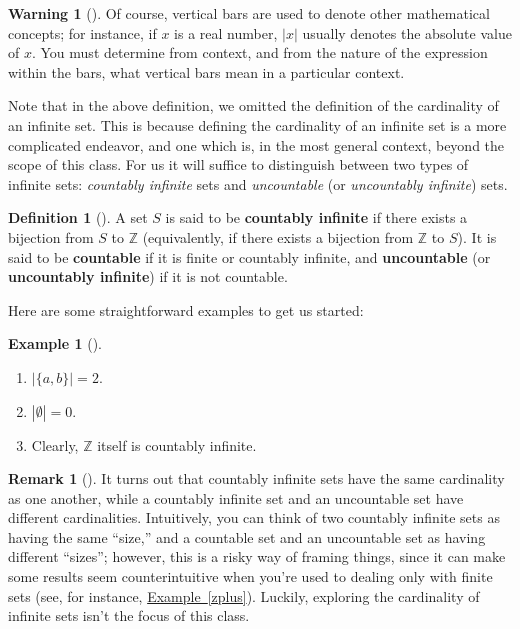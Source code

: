 \documentclass[10pt,]{book}
\newcommand{\terminology}[1]{\textbf{#1}}
\theoremstyle{plain}
\theoremstyle{definition}
\newtheorem{definition}[theorem]{Definition}
\theoremstyle{definition}
\newtheorem{remark}[theorem]{Remark}
\newtheorem{warning}[theorem]{Warning}
\theoremstyle{definition}
\newtheorem{example}[theorem]{Example}
\theoremstyle{definition}
\numberwithin{equation}{section}
\def\Z{\mathbb{Z}}
\begin{document}
    \begin{warning}[]\label{warning-3}
Of course, vertical bars are used to denote
    other mathematical concepts; for instance, if \(x\) is a real
    number, \(|x|\) usually denotes the absolute value of \(x\). You
    must determine from context, and from the nature of the
    expression within the bars, what vertical bars mean in a
    particular context.%
\end{warning}

%
\par
Note that in the above definition, we omitted the definition of the cardinality of an infinite set.  This is because defining the cardinality of an infinite set is a more complicated endeavor, and one which is, in the most general context, beyond the scope of this class.  For us it will suffice to distinguish between two types of infinite sets: \emph{countably infinite} sets and \emph{uncountable} (or \emph{uncountably infinite}) sets.%
\begin{definition}[{}]\label{definition-13}
 A set \(S\) is said to be \terminology{countably infinite} if there exists a bijection from \(S\) to \(\Z\) (equivalently, if there
        exists a bijection from \(\Z\) to \(S\)). It is said to be \terminology{countable} if it is finite or countably infinite, and \terminology{uncountable} (or \terminology{uncountably infinite}) if it is not countable.%
\end{definition}
\par
  Here are some straightforward examples to get us started:%
\begin{example}[]\label{example-8}


 
    \leavevmode%
\begin{enumerate}
\item\hypertarget{li-16}{} \(|\{a,b\}|=2\). %
\item\hypertarget{li-17}{}\(|\emptyset|=0\).%
\item\hypertarget{li-18}{} Clearly, \(\Z\) itself is countably
        infinite.
\end{enumerate}

\end{example}
\begin{remark}[]\label{remark-3}
It turns out that countably infinite sets have the same cardinality as one another, while a countably infinite set and an uncountable set have different cardinalities. Intuitively, you  can think  of two countably infinite sets as having the same ``size,'' and a countable set and an uncountable set as having different ``sizes''; however, this is a risky way of framing things, since it can  make some results seem counterintuitive when you're used to dealing only with finite sets (see, for instance, \hyperref[zplus]{Example~\ref{zplus}}).  Luckily, exploring the cardinality of infinite sets isn't the focus of this class.%
\end{remark}
\par
\end{document}
